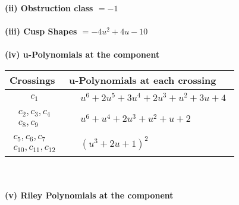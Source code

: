 \documentclass[1p]{elsarticle_modified}
\theoremstyle{definition}
\begin{document}
\flushleft \textbf{(ii) Obstruction class $= -1$}\\~\\
\flushleft \textbf{(iii) Cusp Shapes $= -4 u^2+4 u-10$}\\~\\
\newpage\renewcommand{\arraystretch}{1}
\flushleft \textbf{(iv) u-Polynomials at the component}\newline \\
\begin{tabular}{m{50pt}|m{274pt}}
Crossings & \hspace{64pt}u-Polynomials at each crossing \\
\hline $$\begin{aligned}c_{1}\end{aligned}$$&$\begin{aligned}
&u^6+2 u^5+3 u^4+2 u^3+u^2+3 u+4
\end{aligned}$\\
\hline $$\begin{aligned}c_{2},c_{3},c_{4}\\c_{8},c_{9}\end{aligned}$$&$\begin{aligned}
&u^6+u^4+2 u^3+u^2+u+2
\end{aligned}$\\
\hline $$\begin{aligned}c_{5},c_{6},c_{7}\\c_{10},c_{11},c_{12}\end{aligned}$$&$\begin{aligned}
&(u^3+2 u+1)^2
\end{aligned}$\\
\hline
\end{tabular}\\~\\
\newpage\renewcommand{\arraystretch}{1}
\flushleft \textbf{(v) Riley Polynomials at the component}\newline \\
\end{document}
